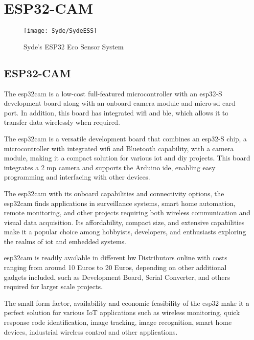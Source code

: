 

\chapter{ESP32-CAM}\label{ESP32description}



\begin{figure}
    \texttt{[image: Syde/SydeESS]}
    \caption{Syde’s ESP32 Eco Sensor System}
\end{figure}

\section{ESP32-CAM}\label{ESP32description}

The \ac{esp32cam} is a low-cost full-featured microcontroller with an \ac{esp32}-S development board along with an onboard camera module and micro-\ac{sd} card port. In addition, this board has integrated \ac{wifi} and \ac{ble}, which allows it to transfer data wirelessly when required.

\medskip

The \ac{esp32cam} is a versatile development board that combines an \ac{esp32}-S chip, a microcontroller with integrated \ac{wifi} and Bluetooth capability, with a camera module, making it a compact solution for various \ac{iot} and \ac{diy} projects. This board integrates a 2 \ac{mp} camera and supports the Arduino \ac{ide}, enabling easy programming and interfacing with other devices. 

\medskip

The \ac{esp32cam} with its onboard capabilities and connectivity options, the \ac{esp32cam} finds applications in surveillance systems, smart home automation, remote monitoring, and other projects requiring both wireless communication and visual data acquisition. Its affordability, compact size, and extensive capabilities make it a popular choice among hobbyists, developers, and enthusiasts exploring the realms of \ac{iot} and embedded systems.

\medskip

\ac{esp32cam} is readily available in different \ac{hw} Distributors online with costs ranging from around 10 Euros to 20 Euros, depending on other additional gadgets included, such as Development Board, Serial Converter, and others required for larger scale projects.

\medskip

The small form factor, availability and economic feasibility of the \ac{esp32} make it a perfect solution for various IoT applications such as wireless monitoring, quick response code identification, image tracking, image recognition, smart home devices, industrial wireless control and other applications.

